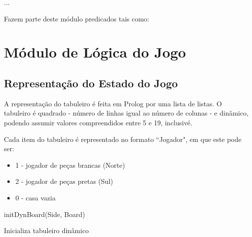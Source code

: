 \documentclass[15pt,a4paper]{article}
\begin{document}
\begin{code}[H]
	\begin{verbatimtab} %


...
\end{verbatimtab}
\caption{Fazem parte deste módulo predicados tais como:}
\end{code}


\newpage

\section{Módulo de Lógica do Jogo}




\subsection{Representação do Estado do Jogo}

A representação do tabuleiro é feita em Prolog por uma lista de listas.
O tabuleiro é quadrado - número de linhas igual ao número de colunas - e dinâmico, podendo assumir valores compreendidos entre 5 e 19, inclusivé.

Cada item do tabuleiro é representado no formato ``Jogador", em que este pode ser:
\begin{itemize}
\item 1 - jogador de peças brancas (Norte)
\item 2 - jogador de peças pretas (Sul)
\item 0 - casa vazia
\end{itemize}

\begin{code}[H]
	\begin{verbatimtab}
initDynBoard(Side, Board)
\end{verbatimtab}
\caption{Inicializa tabuleiro dinâmico}
\end{code}
\end{document}
